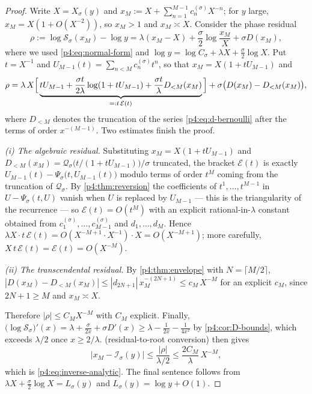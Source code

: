 \documentclass[11pt,a4paper,oneside]{book}
\theoremstyle{plain}
\theoremstyle{definition}
\theoremstyle{remark}
\newcommand{\Xcore}{X}
\begin{document}
\begin{proof}
Write $\Xcore=\Xcore_\sigma(y)$ and
$x_M:=\Xcore+\sum_{n=1}^{M-1}c^{(\sigma)}_n\Xcore^{-n}$; for $y$ large,
$x_M=\Xcore(1+O(\Xcore^{-2}))$, so $x_M>1$ and $x_M\asymp\Xcore$.  Consider
the phase residual
\[
  \rho:=\log\mathcal S_\sigma(x_M)-\log y
   =\lambda(x_M-\Xcore)
     +\frac\sigma2\log\frac{x_M}{\Xcore}+\sigma D(x_M),
\]
where we used \cref{p4:eq:normal-form} and
$\log y=\log C_\sigma+\lambda\Xcore+\tfrac\sigma2\log\Xcore$.  Put
$t=\Xcore^{-1}$ and $U_{M-1}(t)=\sum_{n<M}c^{(\sigma)}_nt^{n}$, so that
$x_M=\Xcore(1+tU_{M-1})$ and
\[
  \rho=\lambda\,\Xcore\Bigl[\,\underbrace{tU_{M-1}
    +\frac{\sigma t}{2\lambda}\log(1+tU_{M-1})
    +\frac{\sigma t}{\lambda}D_{<M}(x_M)}_{=:t\,\mathcal E(t)}\,\Bigr]
   +\sigma\bigl(D(x_M)-D_{<M}(x_M)\bigr),
\]
where $D_{<M}$ denotes the truncation of the series
\cref{p4:eq:d-bernoulli} after the terms of order $x^{-(M-1)}$.  Two
estimates finish the proof.

\emph{(i) The algebraic residual.}  Substituting $x_M=\Xcore(1+tU_{M-1})$ and
$D_{<M}(x_M)=\mathcal Q_\sigma\bigl(t/(1+tU_{M-1})\bigr)/\sigma$ truncated,
the bracket $\mathcal E(t)$ is exactly
$U_{M-1}(t)-\Psi_\sigma\bigl(t,U_{M-1}(t)\bigr)$ modulo terms of order
$t^{M}$ coming from the truncation of $\mathcal Q_\sigma$.  By
\cref{p4:thm:reversion} the coefficients of $t^{1},\ldots,t^{M-1}$ in
$U-\Psi_\sigma(t,U)$ vanish when $U$ is replaced by $U_{M-1}$ --- this is the
triangularity of the recurrence --- so $\mathcal E(t)=O(t^{M})$ with an
explicit rational-in-$\lambda$ constant obtained from
$c^{(\sigma)}_1,\ldots,c^{(\sigma)}_{M-1}$ and $d_1,\ldots,d_{M}$.  Hence
$\lambda\Xcore\cdot t\,\mathcal E(t)=O(\Xcore^{-M+1}\cdot\Xcore^{-1})\cdot
\Xcore=O(\Xcore^{-M+1})$; more carefully, $\Xcore\,t\,\mathcal E(t)
=\mathcal E(t)=O(\Xcore^{-M})$.

\emph{(ii) The transcendental residual.}  By \cref{p4:thm:envelope} with
$N=\lceil M/2\rceil$,
$|D(x_M)-D_{<M}(x_M)|\le|d_{2N+1}|\,x_M^{-(2N+1)}\le
c_M\,\Xcore^{-M}$ for an explicit $c_M$, since $2N+1\ge M$ and
$x_M\asymp\Xcore$.

Therefore $|\rho|\le C_M\Xcore^{-M}$ with $C_M$ explicit.  Finally,
$\bigl(\log\mathcal S_\sigma\bigr)'(x)=\lambda+\tfrac\sigma{2x}+\sigma D'(x)
\ge\lambda-\tfrac1{2x}-\tfrac1{4x^{2}}$ by \cref{p4:cor:D-bounds}, which
exceeds $\lambda/2$ once $x\ge2/\lambda$.  
(residual-to-root conversion) then gives
\[
  |x_M-\mathcal I_\sigma(y)|\le\frac{|\rho|}{\lambda/2}
   \le\frac{2C_M}{\lambda}\,\Xcore^{-M},
\]
which is \cref{p4:eq:inverse-analytic}.  The final sentence follows from
$\lambda\Xcore+\tfrac\sigma2\log\Xcore=L_\sigma(y)$ and
$L_\sigma(y)=\log y+O(1)$.
\end{proof}
\end{document}
